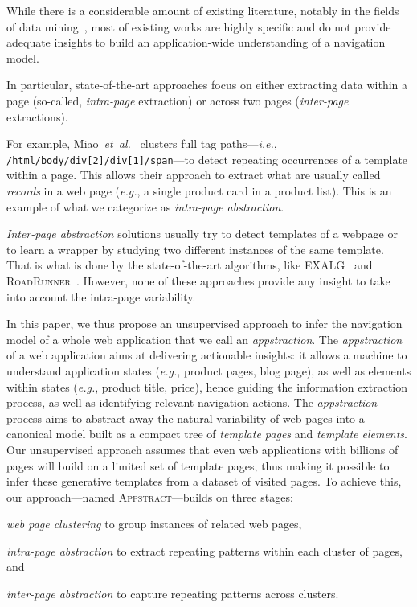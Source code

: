 \documentclass[sigconf,authordraft]{acmart}
\theoremstyle{definition}
\begin{document}
While there is a considerable amount of existing literature, notably in the fields of data mining~\cite{Zhai2005WebAlignment, ArasuExtractingPages, Crescenzi2001RoadRunner:Sites, Sarawagi1996InformationExtraction, ChaudhariTemplatePages, MiaoExtractingClustering}, most of existing works are highly specific and do not provide adequate insights to build an application-wide understanding of a navigation model.

In particular, state-of-the-art approaches focus on either extracting data within a page (so-called, \emph{intra-page} extraction) or across two pages (\emph{inter-page} extractions). 

For example, Miao~\textit{et~al.}~\cite{MiaoExtractingClustering} clusters full tag paths---\emph{i.e.}, \texttt{/html/bo\-dy/div[2]/div[1]/span}---to detect repeating occurrences of a template within a page.
This allows their approach to extract what are usually called \emph{records} in a web page (\emph{e.g.}, a single product card in a product list).
This is an example of what we categorize as \emph{intra-page abstraction}.

\emph{Inter-page abstraction} solutions usually try to detect templates of a webpage or to learn a wrapper by studying two different instances of the same template.
That is what is done by the state-of-the-art algorithms, like EXALG~\cite{ArasuExtractingPages} and \textsc{RoadRunner}~\cite{Crescenzi2001RoadRunner:Sites}.
However, none of these approaches provide any insight to take into account the intra-page variability.

In this paper, we thus propose an unsupervised approach to infer the navigation model of a whole web application that we call an \textit{appstraction}.
The \textit{appstraction} of a web application aims at delivering actionable insights: it allows a machine to understand application states (\emph{e.g.}, product pages, blog page), as well as elements within states (\emph{e.g.}, product title, price), hence guiding the information extraction process, as well as identifying relevant navigation actions.
The \textit{appstraction} process aims to abstract away the natural variability of web pages into a canonical model built as a compact tree of \emph{template pages} and \emph{template elements}.
Our unsupervised approach assumes that even web applications with billions of pages will build on a limited set of template pages, thus making it possible to infer these generative templates from a dataset of visited pages.
To achieve this, our approach---named \textsc{Appstract}---builds on three stages:
\begin{inparaenum}
    \item \textit{web page clustering} to group instances of related web pages,
    \item \textit{intra-page abstraction} to extract repeating patterns within each cluster of pages, and
    \item \textit{inter-page abstraction} to capture repeating patterns across clusters.
\end{inparaenum}
\end{document}
